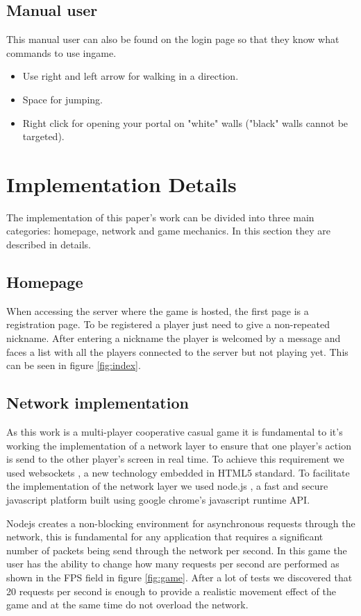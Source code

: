 \documentclass{chi-ext}
\begin{document}
\subsection{Manual user}
This manual user can also be found on the login page so that they know what commands to use ingame.
\begin{itemize}
\item Use right and left arrow for walking in a direction.
\item Space for jumping.
\item Right click for opening your portal on "white" walls ("black" walls cannot be targeted).
\end{itemize}

\section{Implementation Details}
The implementation of this paper's work can be divided into three main categories: homepage, network and game mechanics. In this section they are described in details.

\subsection{Homepage}
When accessing the server where the game is hosted, the first page is a registration page. To be registered a player just need to give a non-repeated nickname. After entering a nickname the player is welcomed by a message and faces a list with all the players connected to the server but not playing yet. This can be seen in figure \ref{fig:index}.



\subsection{Network implementation}
As this work is a multi-player cooperative casual game it is fundamental to it's working the implementation of a network layer to ensure that one player's action is send to the other player's screen in real time. To achieve this requirement we used websockets \cite{websockets}, a new technology embedded in HTML5 standard. To facilitate the implementation of the network layer we used node.js \cite{nodejs}, a fast and secure javascript platform built using google chrome's javascript runtime API.

Nodejs creates a non-blocking environment for asynchronous requests through the network, this is fundamental for any application that requires a significant number of packets being send through the network per second. In this game the user has the ability to change how many requests per second are performed as shown in the FPS field in figure \ref{fig:game}. After a lot of tests we discovered that 20 requests per second is enough to provide a realistic movement effect of the game and at the same time do not overload the network.
\end{document}
